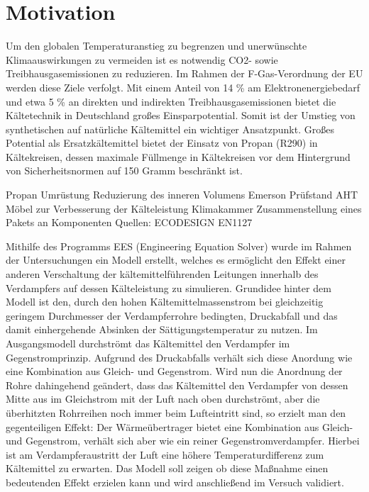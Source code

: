 \chapter{Motivation}
\label{cha:Motivation}



Um den globalen Temperaturanstieg zu begrenzen und unerwünschte Klimaauswirkungen zu vermeiden ist es notwendig CO2- sowie Treibhausgasemissionen zu reduzieren. Im Rahmen der F-Gas-Verordnung der EU werden diese Ziele verfolgt. Mit einem Anteil von 14 \%  am Elektronenergiebedarf und etwa 5 \% an direkten und indirekten Treibhausgasemissionen bietet die Kältetechnik in Deutschland großes Einsparpotential. Somit ist der Umstieg von synthetischen auf natürliche Kältemittel ein wichtiger Ansatzpunkt. 
Großes Potential als Ersatzkältemittel bietet der Einsatz von Propan (R290) in Kältekreisen, dessen maximale Füllmenge in Kältekreisen vor dem Hintergrund von Sicherheitsnormen auf 150 Gramm beschränkt ist. 

Propan Umrüstung
Reduzierung des inneren Volumens
Emerson Prüfstand AHT Möbel zur Verbesserung der Kälteleistung
Klimakammer
Zusammenstellung eines Pakets an Komponenten
Quellen:
ECODESIGN
EN1127

Mithilfe des Programms EES (Engineering Equation Solver) wurde im Rahmen der Untersuchungen ein Modell erstellt, welches es ermöglicht den Effekt einer anderen Verschaltung der kältemittelführenden Leitungen innerhalb des Verdampfers auf dessen Kälteleistung zu simulieren. Grundidee hinter dem Modell ist den, durch den hohen Kältemittelmassenstrom bei gleichzeitig geringem Durchmesser der Verdampferrohre bedingten, Druckabfall und das damit einhergehende Absinken der Sättigungstemperatur zu nutzen. Im Ausgangsmodell durchströmt das Kältemittel den Verdampfer im Gegenstromprinzip. Aufgrund des Druckabfalls verhält sich diese Anordung wie eine Kombination aus Gleich- und Gegenstrom. Wird nun die Anordnung der Rohre dahingehend geändert, dass das Kältemittel den Verdampfer von dessen Mitte aus im Gleichstrom mit der Luft nach oben durchströmt, aber die überhitzten Rohrreihen noch immer beim Lufteintritt sind, so erzielt man den gegenteiligen Effekt: Der Wärmeübertrager bietet eine Kombination aus Gleich- und Gegenstrom, verhält sich aber wie ein reiner Gegenstromverdampfer. Hierbei ist am Verdampferaustritt der Luft eine höhere Temperaturdifferenz zum Kältemittel zu erwarten.
Das Modell soll zeigen ob diese Maßnahme einen bedeutenden Effekt erzielen kann und wird anschließend im Versuch validiert.





